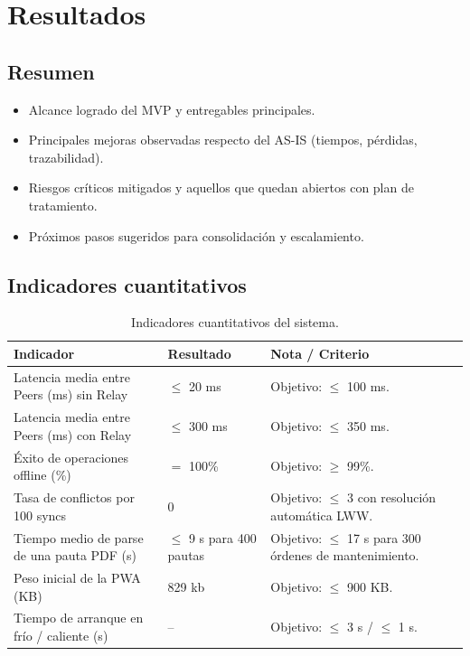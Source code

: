 \documentclass[10pt,a4paper]{report}
\begin{document}
\chapter*{Resultados}

\section*{Resumen}
\begin{itemize}
    \item Alcance logrado del MVP y entregables principales.
    \item Principales mejoras observadas respecto del AS-IS (tiempos, pérdidas, trazabilidad).
    \item Riesgos críticos mitigados y aquellos que quedan abiertos con plan de tratamiento.
    \item Próximos pasos sugeridos para consolidación y escalamiento.
\end{itemize}

\section*{Indicadores cuantitativos}
\begin{table}[H]
    \centering
    \begin{tabular}{p{5cm} p{3cm} p{3cm} p{5cm}}
        \hline
        \textbf{Indicador} & \textbf{Resultado} & \textbf{Nota / Criterio} \\
        \hline
        Latencia media entre Peers (ms) sin Relay& $\leq$ 20 ms & Objetivo: $\leq$ 100 ms. \\
        Latencia media entre Peers (ms) con Relay & $\leq$ 300 ms& Objetivo: $\leq$ 350 ms. \\
        Éxito de operaciones offline (\%)  & $=$ 100\% & Objetivo: $\geq$ 99\%. \\
        Tasa de conflictos por 100 syncs & 0 & Objetivo: $\leq$ 3 con resolución automática LWW. \\
        Tiempo medio de parse de una pauta PDF (s) & $\leq$ 9 s para 400 pautas & Objetivo: $\leq$ 17 s para 300 órdenes de mantenimiento. \\
        Peso inicial de la PWA (KB) & 829 kb & Objetivo: $\leq$ 900 KB. \\
        Tiempo de arranque en frío / caliente (s) & -- & Objetivo: $\leq$ 3 s / $\leq$ 1 s. \\
        \hline
    \end{tabular}
    \caption{Indicadores cuantitativos del sistema.}
    \label{tab:resultados-metricas}
\end{table}
\end{document}
